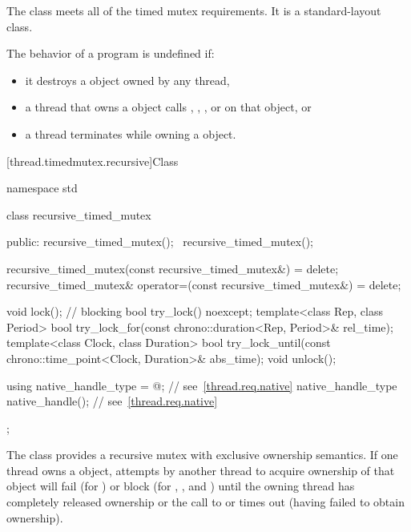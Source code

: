 \pnum
The class  meets
all of the timed mutex requirements.
It is a standard-layout class.

\pnum
The behavior of a program is undefined if:
\begin{itemize}
\item it destroys a  object owned by any thread,
\item a thread that owns a  object calls ,
, , or  on that object, or
\item a thread terminates while owning a  object.
\end{itemize}

[thread.timedmutex.recursive]{Class }

%
\begin{codeblock}
namespace std {
  class recursive_timed_mutex {
  public:
    recursive_timed_mutex();
    ~recursive_timed_mutex();

    recursive_timed_mutex(const recursive_timed_mutex&) = delete;
    recursive_timed_mutex& operator=(const recursive_timed_mutex&) = delete;

    void lock();    // blocking
    bool try_lock() noexcept;
    template<class Rep, class Period>
      bool try_lock_for(const chrono::duration<Rep, Period>& rel_time);
    template<class Clock, class Duration>
      bool try_lock_until(const chrono::time_point<Clock, Duration>& abs_time);
    void unlock();

    using native_handle_type = @\impdefnc@;          // see~\ref{thread.req.native}
    native_handle_type native_handle();                         // see~\ref{thread.req.native}
  };
}
\end{codeblock}

\pnum
{}%
The class  provides a recursive mutex with exclusive
ownership semantics. If one thread owns a  object,
attempts by another thread to acquire ownership of that object will fail (for
) or block (for , , and
) until the owning thread has completely released
ownership or the call to  or 
times out (having failed to obtain ownership).


